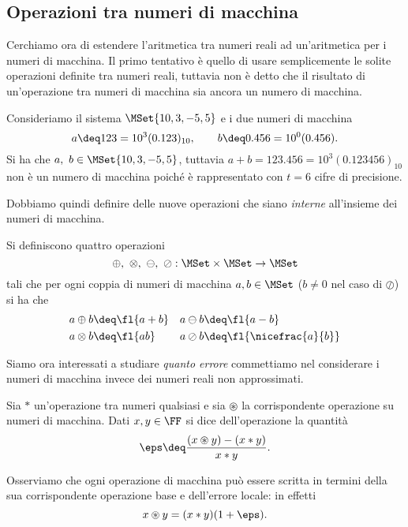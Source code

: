 \subsection{Operazioni tra numeri di macchina}

Cerchiamo ora di estendere l'aritmetica tra numeri reali ad un'aritmetica per i numeri di macchina. Il primo tentativo è quello di usare semplicemente le solite operazioni definite tra numeri reali, tuttavia non è detto che il risultato di un'operazione tra numeri di macchina sia ancora un numero di macchina.

\begin{example}
    Consideriamo il sistema $\MSet{10, 3, -5, 5}$ e i due numeri di macchina \[
        a \deq 123 = 10^3 (0.123)_{10}, \qquad b \deq 0.456 = 10^0 (0.456).
    \] Si ha che $a,\ b \in \MSet{10, 3, -5, 5}$, tuttavia $a + b = 123.456 = 10^3 (0.123456)_{10}$ non è un numero di macchina poiché è rappresentato con $t = 6$ cifre di precisione.
\end{example}

Dobbiamo quindi definire delle nuove operazioni che siano \emph{interne} all'insieme dei numeri di macchina.

\begin{definition}
     Si definiscono quattro operazioni \[
        \oplus,\ \otimes,\ \ominus,\ \oslash : \MSet \times \MSet \to \MSet
    \] tali che per ogni coppia di numeri di macchina $a, b \in \MSet$ ($b \neq 0$ nel caso di $\oslash$) si ha che \begin{align*}
        &a \oplus b \deq \fl{a + b} &&a \ominus b \deq \fl{a - b}\\
        &a \otimes b \deq \fl{ab}   &&a \oslash b \deq \fl{\nicefrac{a}{b}}
    \end{align*}
\end{definition}

Siamo ora interessati a studiare \emph{quanto errore} commettiamo nel considerare i numeri di macchina invece dei numeri reali non approssimati.

\begin{definition}
    Sia $\ast$ un'operazione tra numeri qualsiasi e sia $\circledast$ la corrispondente operazione su numeri di macchina. Dati $x, y \in \FF$ si dice  dell'operazione la quantità \[
        \eps \deq \frac{(x \circledast y) - (x \ast y)}{x \ast y}.
    \]
\end{definition}

Osserviamo che ogni operazione di macchina può essere scritta in termini della sua corrispondente operazione base e dell'errore locale: in effetti \[
    x \circledast y = (x \ast y)(1 + \eps).
\]


